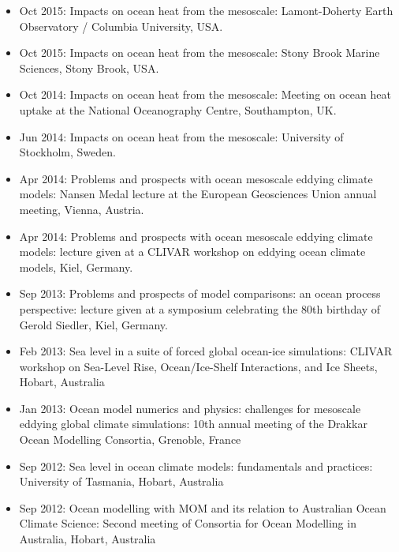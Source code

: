 \begin{itemize}[leftmargin=*]
\item Oct 2015: {\sc Impacts on ocean heat from the mesoscale}:
  Lamont-Doherty Earth Observatory / Columbia University, USA.

\item Oct 2015: {\sc Impacts on ocean heat from the mesoscale}: Stony
  Brook Marine Sciences, Stony Brook, USA.

\item Oct 2014: {\sc Impacts on ocean heat from the mesoscale}:
  Meeting on ocean heat uptake at the National Oceanography Centre,
  Southampton, UK.

\item Jun 2014: {\sc Impacts on ocean heat from the mesoscale}:
  University of Stockholm, Sweden.

\item Apr 2014: {\sc Problems and prospects with ocean mesoscale
    eddying climate models}: Nansen Medal lecture at the European
  Geosciences Union annual meeting, Vienna, Austria.

\item Apr 2014: {\sc Problems and prospects with ocean mesoscale
    eddying climate models}: lecture given at a CLIVAR workshop on
  eddying ocean climate models, Kiel, Germany.

\item Sep 2013: {\sc Problems and prospects of model comparisons: an
    ocean process perspective}: lecture given at a symposium
  celebrating the 80th birthday of Gerold Siedler, Kiel, Germany.

\item Feb 2013: {\sc Sea level in a suite of forced global ocean-ice
    simulations}: CLIVAR workshop on Sea-Level Rise, Ocean/Ice-Shelf
  Interactions, and Ice Sheets, Hobart, Australia

\item Jan 2013: {\sc Ocean model numerics and physics: challenges for
    mesoscale eddying global climate simulations}: 10th annual meeting
  of the Drakkar Ocean Modelling Consortia, Grenoble, France

\item Sep 2012: {\sc Sea level in ocean climate models: fundamentals
    and practices}: University of Tasmania, Hobart, Australia

\item Sep 2012: {\sc Ocean modelling with MOM and its relation to
    Australian Ocean Climate Science}: Second meeting of Consortia for
  Ocean Modelling in Australia, Hobart, Australia


\end{itemize}
